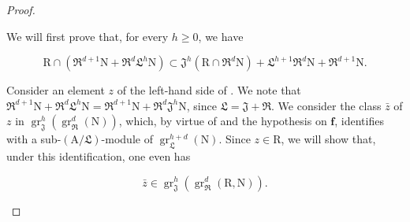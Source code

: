 \begin{proof}
\begin{env}[19.7.1.18]
We will first prove that, for every $h\geqslant 0$, we have
\end{env}
\begin{env}[19.7.1.19]
\label{IV.19.7.1.19}
\[
  \mathrm{R}\cap(\mathfrak{R}^{d+1}\mathrm{N}+\mathfrak{R}^d\mathfrak{L}^h\mathrm{N})\subset\mathfrak{J}^h(\mathrm{R}\cap\mathfrak{R}^d\mathrm{N})+\mathfrak{L}^{h+1}\mathfrak{R}^d\mathrm{N}+\mathfrak{R}^{d+1}\mathrm{N}.
\]
\end{env}

Consider an element $z$ of the left-hand side of . We note that $\mathfrak{R}^{d+1}\mathrm{N}+\mathfrak{R}^d\mathfrak{L}^h\mathrm{N}=\mathfrak{R}^{d+1}\mathrm{N}+\mathfrak{R}^d\mathfrak{J}^h\mathrm{N}$, since $\mathfrak{L}=\mathfrak{J}+\mathfrak{R}$. We consider the class $\bar{z}$ of $z$ in $\operatorname{gr}_\mathfrak{J}^{h}(\operatorname{gr}_\mathfrak{R}^{d}(\mathrm{N}))$, which, by virtue of  and the hypothesis on $\mathbf{f}$, identifies with a sub-$(\mathrm{A}/\mathfrak{L})$-module of $\operatorname{gr}_\mathfrak{L}^{h+d}(\mathrm{N})$. Since $z\in\mathrm{R}$, we will show that, under this identification, one even has

\begin{env}[19.7.1.20]
\label{IV.19.7.1.20}
\[
  \bar{z}\in\operatorname{gr}_\mathfrak{J}^{h}(\operatorname{gr}_\mathfrak{R}^{d}(\mathrm{R},\mathrm{N})).
\]
\end{env}


\end{proof}
